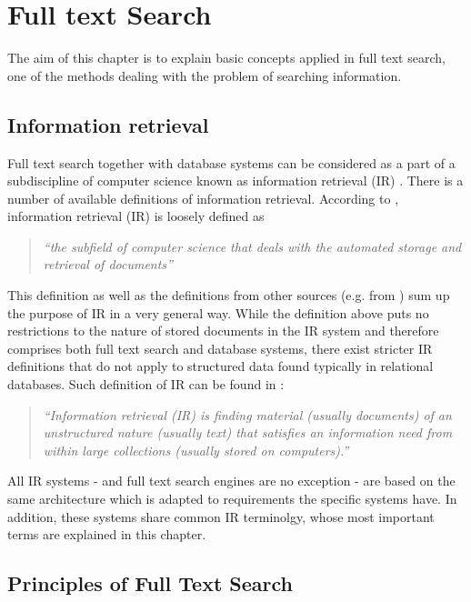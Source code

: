 \chapter{Full text Search}

The aim of this chapter is to explain basic concepts applied in full
text search, one of the methods dealing with the problem of searching information.

\section{Information retrieval}

Full text search together with database systems can be considered  as a part of a subdiscipline of computer science known
as information retrieval (IR) \cite{Witten:1999:MGC:323905}.
There is a number of available definitions of information retrieval.
According to \cite{IRDataAlgorithms}, information
retrieval (IR) is loosely defined as

	\begin{quote}
		\textsl{``the subfield of computer science
	that deals with the automated storage and retrieval of documents''}
	\end{quote}

This definition as well as the definitions from other sources (e.g. from \cite{Witten:1999:MGC:323905}) sum up the purpose of IR in a very general way.
While the definition above puts no restrictions to the nature of stored documents in the IR system and therefore comprises both full text search and database systems, there exist stricter IR definitions that do not apply to structured data found typically in relational databases. 
Such definition of IR can be found in \cite{Manning:2008:IIR:1394399}:

	\begin{quote}
		\textsl{``Information retrieval (IR) is finding material (usually documents) of an unstructured nature (usually  text) that satisfies an information need from within large collections (usually stored on computers).''}
	\end{quote}

All IR systems - and full text search engines are no exception - are based on the same architecture which is adapted to requirements the specific systems have. In addition, these systems share common IR terminolgy, whose most important terms are explained in this chapter.

\section{Principles of Full Text Search}

